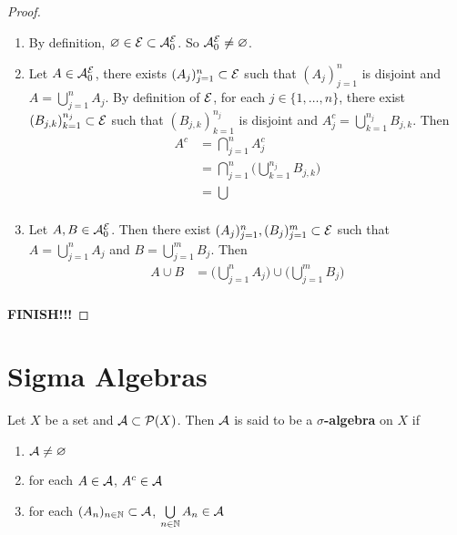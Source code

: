 \documentclass{book}
\begin{document}
	\begin{proof}\
		\begin{enumerate}
			\item By definition, $\varnothing \in \mathcal{E} \subset \mathcal{A}^{\mathcal{E}}_0$. So $\mathcal{A}^{\mathcal{E}}_0 \neq \varnothing$. 
			\item Let $A \in \mathcal{A}^{\mathcal{E}}_0$, there exists $(A_j)_{j=1}^n \subset \mathcal{E}$ such that $(A_j)_{j=1}^n$ is disjoint and $A = \bigcup\limits_{j =1}^n A_j$. By definition of $\mathcal{E}$, for each $j \in \{1, \ldots, n\}$, there exist $(B_{j,k})_{k=1}^{n_j} \subset \mathcal{E}$ such that $(B_{j,k})_{k=1}^{n_j}$ is disjoint and $A_j^c = \bigcup\limits_{k=1}^{n_j}B_{j,k}$. Then 
			\begin{align*}
				A^c 
				&= \bigcap_{j=1}^n A_j^c \\
				&= \bigcap_{j=1}^n \bigg( \bigcup\limits_{k=1}^{n_j}B_{j,k} \bigg)\\
				&= \bigcup\\
			\end{align*}	 
			\item Let $A, B \in \mathcal{A}^{\mathcal{E}}_0$. Then there exist $(A_j)_{j=1}^n, (B_j)_{j=1}^m \subset \mathcal{E}$ such that $A = \bigcup\limits_{j=1}^n A_j$ and  $B = \bigcup\limits_{j=1}^m B_j$. Then 
			\begin{align*}
				A \cup B 
				&=  \bigg( \bigcup\limits_{j=1}^n A_j \bigg) \cup \bigg( \bigcup\limits_{j=1}^m B_j \bigg) \\
			\end{align*}
		\end{enumerate}
		\textbf{FINISH!!!}
	\end{proof}

	
























	\newpage
	\section{Sigma Algebras}
		
	\begin{defn}  
		Let $X$ be a set and $\mathcal{A} \subset \mathcal{P}(X)$. Then $\mathcal{A}$ is said to be a $\sigma$\textbf{-algebra} on $X$ if 
		\begin{enumerate}
			\item $\mathcal{A} \neq \varnothing$
			\item for each $A \in \mathcal{A}$, $A^c \in \mathcal{A}$
			\item for each $(A_n)_{n \in \mathbb{N}} \subset \mathcal{A}$, $\bigcup\limits_{n \in \mathbb{N}}A_n \in \mathcal{A}$
		\end{enumerate}
	\end{defn}
	
\end{document}
